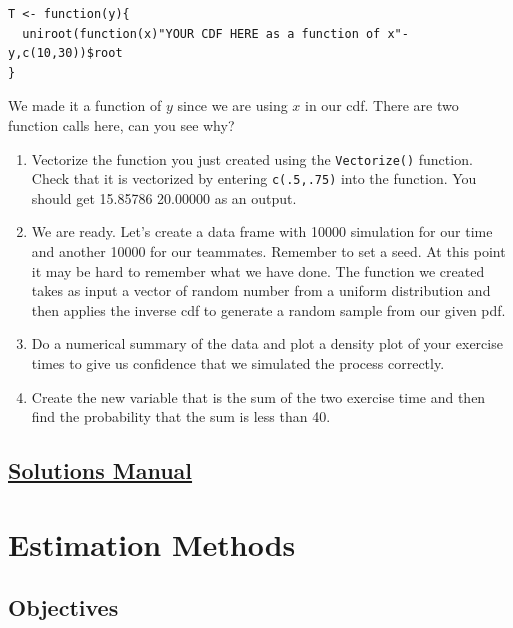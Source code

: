 \documentclass[
  letterpaper,
  DIV=11,
  numbers=noendperiod]{scrreprt}
\begin{document}
\begin{verbatim}
T <- function(y){
  uniroot(function(x)"YOUR CDF HERE as a function of x"-y,c(10,30))$root
}
\end{verbatim}

We made it a function of \(y\) since we are using \(x\) in our cdf.
There are two function calls here, can you see why?

\begin{enumerate}
\def\labelenumi{\alph{enumi}.}
\setcounter{enumi}{4}
\item
  Vectorize the function you just created using the \texttt{Vectorize()}
  function. Check that it is vectorized by entering \texttt{c(.5,.75)}
  into the function. You should get 15.85786 20.00000 as an output.
\item
  We are ready. Let's create a data frame with 10000 simulation for our
  time and another 10000 for our teammates. Remember to set a seed. At
  this point it may be hard to remember what we have done. The function
  we created takes as input a vector of random number from a uniform
  distribution and then applies the inverse cdf to generate a random
  sample from our given pdf.
\item
  Do a numerical summary of the data and plot a density plot of your
  exercise times to give us confidence that we simulated the process
  correctly.
\item
  Create the new variable that is the sum of the two exercise time and
  then find the probability that the sum is less than 40.
\end{enumerate}

\section*{\texorpdfstring{\href{https://ds-usafa.github.io/CPS-Solutions-Manual/TRANS.html}{Solutions
Manual}}{Solutions Manual}}\label{solutions-manual-16}


\chapter{Estimation Methods}\label{EST}

\section{Objectives}\label{objectives-17}
\end{document}
